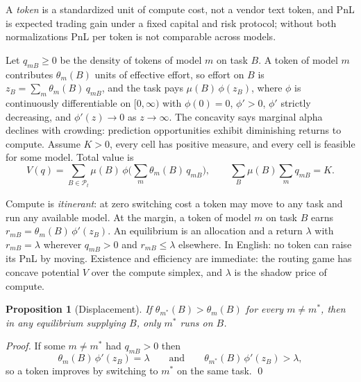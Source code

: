 \documentclass[preprint,11pt,authoryear]{elsarticle}
\newtheorem{proposition}{Proposition}
\begin{document}
A \emph{token} is a standardized unit of compute cost, not a vendor text token, and PnL is expected trading gain under a fixed capital and risk protocol; without both normalizations PnL per token is not comparable across models.

Let $q_{mB} \ge 0$ be the density of tokens of model $m$ on task $B$. A token of model $m$ contributes $\theta_m(B)$ units of effective effort, so effort on $B$ is $z_B = \sum_m \theta_m(B)\, q_{mB}$, and the task pays $\mu(B)\,\phi(z_B)$, where $\phi$ is continuously differentiable on $[0,\infty)$ with $\phi(0) = 0$, $\phi' > 0$, $\phi'$ strictly decreasing, and $\phi'(z) \to 0$ as $z \to \infty$. The concavity says marginal alpha declines with crowding: prediction opportunities exhibit diminishing returns to compute. Assume $K > 0$, every cell has positive measure, and every cell is feasible for some model. Total value is
\begin{equation}
\label{eq:V}
V(q) = \sum_{B \in \mathcal{P}_t} \mu(B)\, \phi\!\Big( \sum_m \theta_m(B)\, q_{mB} \Big),
\qquad
\sum_B \mu(B) \sum_m q_{mB} = K.
\end{equation}

Compute is \emph{itinerant}: at zero switching cost a token may move to any task and run any available model. At the margin, a token of model $m$ on task $B$ earns $r_{mB} = \theta_m(B)\, \phi'(z_B)$. An equilibrium is an allocation and a return $\lambda$ with $r_{mB} = \lambda$ wherever $q_{mB} > 0$ and $r_{mB} \le \lambda$ elsewhere. In English: no token can raise its PnL by moving. Existence and efficiency are immediate: the routing game has concave potential $V$ over the compute simplex, and $\lambda$ is the shadow price of compute.

\begin{proposition}[Displacement]
\label{prop:displacement}
If $\theta_{m^*}(B) > \theta_m(B)$ for every $m \neq m^*$, then in any equilibrium supplying $B$, only $m^*$ runs on $B$.
\end{proposition}

\begin{proof}
If some $m \neq m^*$ had $q_{mB} > 0$ then
\begin{equation*}
\theta_m(B)\,\phi'(z_B) = \lambda
\qquad\text{and}\qquad
\theta_{m^*}(B)\,\phi'(z_B) > \lambda,
\end{equation*}
so a token improves by switching to $m^*$ on the same task. \qed
\end{proof}
\end{document}
